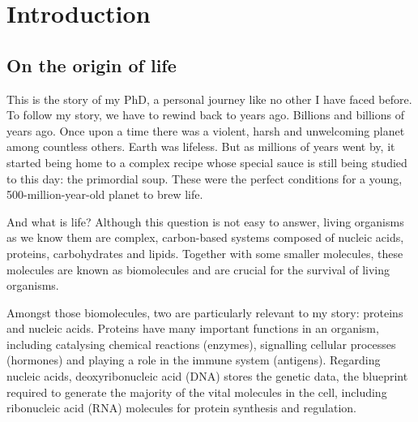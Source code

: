 \chapter{Introduction}

\section{On the origin of life}

This is the story of my PhD, a personal journey like no other I have faced before. To follow my story, we have to rewind back to years ago. Billions and billions of years ago. Once upon a time there was a violent, harsh and unwelcoming planet among countless others. Earth was lifeless. But as millions of years went by, it started being home to a complex recipe whose special sauce is still being studied to this day: the primordial soup. These were the perfect conditions for a young, 500-million-year-old planet to brew life.

And what is life? Although this question is not easy to answer, living organisms as we know them are complex, carbon-based systems composed of nucleic acids, proteins, carbohydrates and lipids. Together with some smaller molecules, these molecules are known as biomolecules and are crucial for the survival of living organisms.

Amongst those biomolecules, two are particularly relevant to my story: proteins and nucleic acids. Proteins have many important functions in an organism, including catalysing chemical reactions (enzymes), signalling cellular processes (hormones) and playing a role in the immune system (antigens). Regarding nucleic acids, deoxyribonucleic acid (DNA) stores the genetic data, the blueprint required to generate the majority of the vital molecules in the cell, including ribonucleic acid (RNA) molecules for protein synthesis and regulation.


